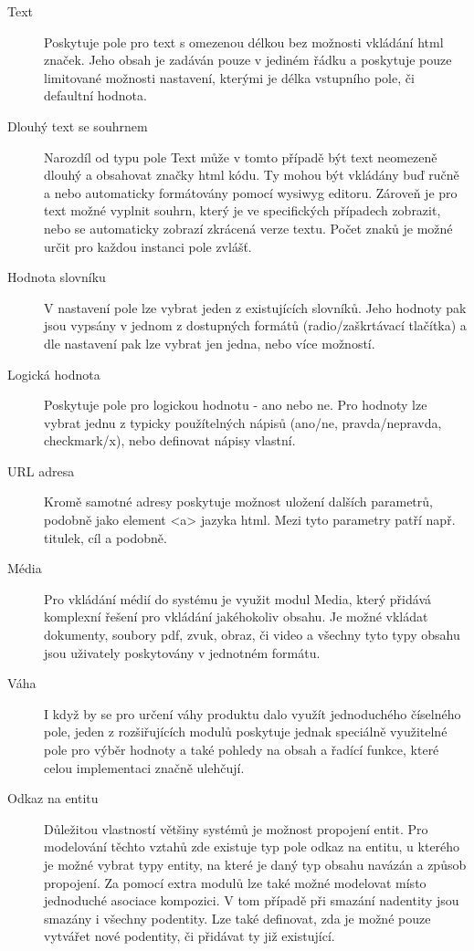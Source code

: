 \begin{description}
  \item[Text] Poskytuje pole pro text s omezenou délkou bez možnosti vkládání html značek. Jeho obsah je zadáván pouze v jediném řádku a poskytuje pouze limitované možnosti nastavení, kterými je délka vstupního pole, či defaultní hodnota. 
  
  \item[Dlouhý text se souhrnem] Narozdíl od typu pole Text může v tomto případě být text neomezeně dlouhý a obsahovat značky html kódu. Ty mohou být vkládány buď ručně a nebo automaticky formátovány pomocí \gls{wysiwyg} editoru. Zároveň je pro text možné vyplnit souhrn, který je ve specifických případech zobrazit, nebo se automaticky zobrazí zkrácená verze textu. Počet znaků je možné určit pro každou instanci pole zvlášť.
  
  \item[Hodnota slovníku] V nastavení pole lze vybrat jeden z existujících slovníků. Jeho hodnoty pak jsou vypsány v jednom z dostupných formátů (radio/zaškrtávací tlačítka) a dle nastavení pak lze vybrat jen jedna, nebo více možností.
  
  \item[Logická hodnota] Poskytuje pole pro logickou hodnotu - ano nebo ne. Pro hodnoty lze vybrat jednu z typicky použítelných nápisů (ano/ne, pravda/nepravda, checkmark/x), nebo definovat nápisy vlastní. 

  \item[URL adresa] Kromě samotné adresy poskytuje možnost uložení dalších parametrů, podobně jako element <a> jazyka html. Mezi tyto parametry patří např. titulek, cíl a podobně.

  \item[Média] Pro vkládání médií do systému je využit modul Media, který přidává komplexní řešení pro vkládání jakéhokoliv obsahu. Je možné vkládat dokumenty, soubory pdf, zvuk, obraz, či video a všechny tyto typy obsahu jsou uživately poskytovány v jednotném formátu.
  
  \item[Váha] I když by se pro určení váhy produktu dalo využít jednoduchého číselného pole, jeden z rozšiřujících modulů poskytuje jednak speciálně využitelné pole pro výběr hodnoty a také pohledy na obsah a řadící funkce, které celou implementaci značně ulehčují.
  
  \item[Odkaz na entitu] Důležitou vlastností většiny systémů je možnost propojení entit. Pro modelování těchto vztahů zde existuje typ pole odkaz na entitu, u kterého je možné vybrat typy entity, na které je daný typ obsahu navázán a způsob propojení. Za pomocí extra modulů lze také možné modelovat místo jednoduché asociace kompozici. V tom případě při smazání nadentity jsou smazány i všechny podentity. Lze také definovat, zda je možné pouze vytvářet nové podentity, či přidávat ty již existující.
\end{description}

